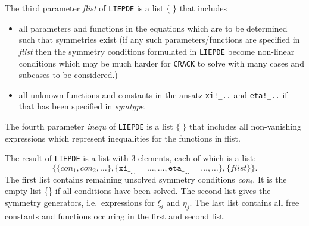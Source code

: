 \noindent The third parameter \textit{flist} of \texttt{LIEPDE} is a list $\{\;\}$ 
that includes
\begin{itemize}
\item all parameters and functions in the equations which are to
      be determined such that symmetries exist (if any such 
      parameters/functions are 
      specified in \textit{flist} then the symmetry conditions 
      formulated in \texttt{LIEPDE}
      become non-linear conditions which may be much harder for
      \texttt{CRACK} to solve with many cases and subcases to be considered.)
\item all unknown functions and constants in the ansatz 
      \verb+xi!_..+ and \verb+eta!_..+
      if that has been specified in \textit{symtype}.
\end{itemize}
\noindent The fourth parameter \textit{inequ} of \texttt{LIEPDE} is a list $\{\;\}$ 
that includes all non-vanishing expressions which represent
inequalities for the functions in flist.

The result of \texttt{LIEPDE} is a list with 3 elements, each of which
is a list:
\[ \{\{\textit{con}_1,\textit{con}_2,\ldots\},
     \{\texttt{xi}\__{\ldots}=\ldots, \ldots,
       \texttt{eta}\__{\ldots}=\ldots, \ldots\},
     \{\textit{flist}\}\}. \]
The first list contains remaining unsolved symmetry conditions \textit{con}$_i$. It
is the empty list \{\} if all conditions have been solved. The second list
gives the symmetry generators, i.e.\ expressions for $\xi_i$ and $\eta_j$. The 
last list contains all free constants and functions occuring in the first
and second list.

%
%
